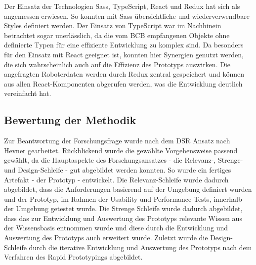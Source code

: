 Der Einsatz der Technologien \ac{Sass}, TypeScript, React und Redux hat sich als angemessen erwiesen. So konnten mit \ac{Sass} übersichtliche und wiederverwendbare Styles definiert werden. Der Einsatz von TypeScript war im Nachhinein betrachtet sogar unerlässlich, da die vom \ac{BCB} empfangenen Objekte ohne definierte Typen für eine effiziente Entwicklung zu komplex sind. Da \deckgl{} besonders für den Einsatz mit React geeignet ist, konnten hier Synergien genutzt werden, die sich wahrscheinlich auch auf die Effizienz des Prototyps auswirken. Die angefragten Roboterdaten werden durch Redux zentral gespeichert und können aus allen React-Komponenten abgerufen werden, was die Entwicklung deutlich vereinfacht hat.

\subsection{Bewertung der Methodik}
Zur Beantwortung der Forschungsfrage wurde nach dem \ac{DSR} Ansatz nach Hevner \cite{Hevner2004} gearbeitet. Rückblickend wurde die gewählte Vorgehensweise passend gewählt, da die Hauptaspekte des Forschungsansatzes - die Relevanz-, Strenge- und Design-Schleife - gut abgebildet werden konnten. So wurde ein fertiges Artefakt - der Prototyp - entwickelt. Die Relevanz-Schleife wurde dadurch abgebildet, dass die Anforderungen basierend auf der Umgebung definiert wurden und der Prototyp, im Rahmen der Usability und Performance Tests, innerhalb der Umgebung getestet wurde. Die Strenge Schleife wurde dadurch abgebildet, dass das zur Entwicklung und Auswertung des Prototyps relevante Wissen aus der Wissensbasis entnommen wurde und diese durch die Entwicklung und Auswertung des Prototyps auch erweitert wurde. Zuletzt wurde die Design-Schleife durch die iterative Entwicklung und Auswertung des Prototyps nach dem Verfahren des Rapid Prototypings abgebildet.
